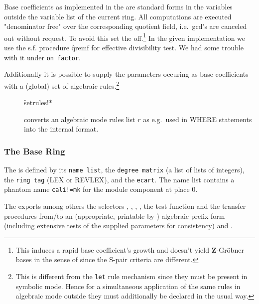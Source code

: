 Base coefficients as implemented in the  are standard
forms in the variables outside the variable list of the current
ring. All computations are executed "denominator free" over the
corresponding quotient field, i.e.\ gcd's are canceled out without
request. To avoid this set the  off.\footnote{This
induces a rapid base coefficient's growth and doesn't yield \textbf{Z}-Gr\"obner
bases in the sense of \cite{Gianni:88} since the S-pair criteria are
different.} In the given implementation we use the s.f. procedure
\f{qremf} for effective divisibility test. We had some trouble with it
under \texttt{on factor}.

Additionally it is possible to supply the
parameters occuring as base coefficients with a (global) set of
algebraic rules.\footnote{This is different from the \texttt{let} rule
mechanism since they must be present in symbolic mode. Hence for a
simultaneous application of the same rules in algebraic mode outside
 they must additionally be declared in the usual way.}
\begin{description}
\item[]
  \hypertarget{procedure:SETRULES!*}{}
  \begin{syntax}
    \f{setrules!*} 
  \end{syntax}
converts an algebraic mode rules list $r$ as e.g.\ used in
WHERE statements into the internal  format.
\end{description}

\subsubsection{The Base Ring}

The  is defined by its \texttt{name list}, the
\texttt{degree matrix} (a list of lists of integers), the \texttt{ring tag} (LEX
or REVLEX), and the \texttt{ecart}. The name list contains a phantom
name \texttt{cali!=mk} for the module component at place 0.
\medskip

The  exports among others the selectors
, ,
,
, the test function  and the
transfer procedures from/to an (appropriate, printable by
) algebraic prefix form  (including
extensive tests of the supplied parameters for consistency) and
.

